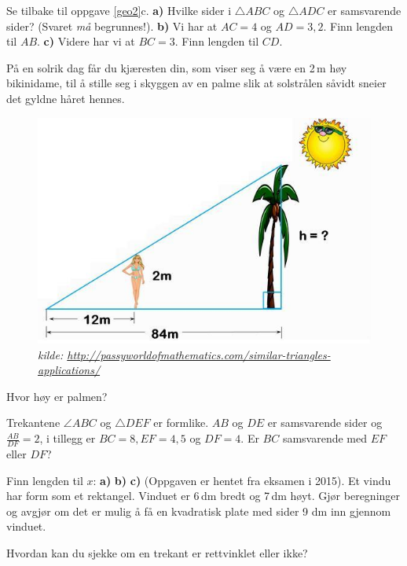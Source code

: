  Se tilbake til oppgave \ref{geo2}c. \os
\textbf{a)} Hvilke sider i $\triangle ABC$ og $ \triangle ADC $ er samsvarende sider? (Svaret \textsl{må} begrunnes!).\os
\textbf{b)} Vi har at $ {AC=4} $ og $ {AD=3,2} $. Finn lengden til $ AB $.  \os
\textbf{c)} Videre har vi at $ {BC=3} $. Finn lengden til $ CD $.

På en solrik dag får du kjæresten din, som viser seg å være en 2\,m høy bikinidame, til å stille seg i skyggen av en palme slik at solstrålen såvidt sneier det gyldne håret hennes.
\begin{figure}
	\centering
	\includegraphics[scale=0.4]{bikini}
	\footnotesize\\
	\textit{kilde: \url{http://passyworldofmathematics.com/similar-triangles-applications/}}
\end{figure}
Hvor høy er palmen?

Trekantene $ \angle ABC $ og $ \triangle DEF $ er formlike. $ AB $ og $ DE $ er samsvarende sider og $ \frac{AB}{DF}=2 $, i tillegg er $ {BC=8, EF=4,5}  $ og $ {DF=4} $. Er $ BC $ samsvarende med $ EF $ eller $ DF $?
\vspace{15pt}

\nes
\nes
\nes
\nes
\nes
{}
Finn lengden til $ x $:\os
\textbf{a)}\vsb
{}
\textbf{b)} \vsb
{}
\textbf{c)}\vsb
{}
\newpage
{} 
(Oppgaven er hentet fra eksamen i 2015).\os
Et vindu har form som et rektangel. Vinduet er 6\,dm bredt og 7\,dm høyt. Gjør beregninger og avgjør om det er mulig å få en kvadratisk plate med sider 9 dm inn
gjennom vinduet.\os

Hvordan kan du sjekke om en trekant er rettvinklet eller ikke?


